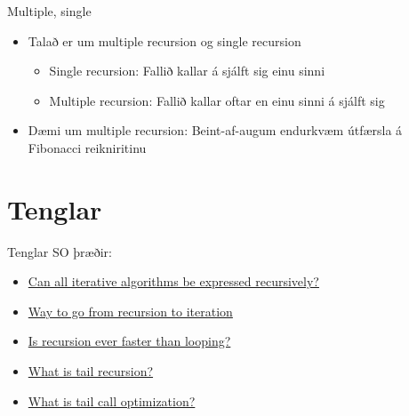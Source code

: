 \documentclass[handout]{beamer}
\begin{document}
\begin{frame}{Multiple, single}

\begin{itemize}
 \item Talað er um multiple recursion og single recursion
 \begin{itemize}
  \item Single recursion: Fallið kallar á sjálft sig einu sinni
  \item Multiple recursion: Fallið kallar oftar en einu sinni á sjálft sig
 \end{itemize}
 \item Dæmi um multiple recursion: Beint-af-augum endurkvæm útfærsla á Fibonacci reikniritinu
\end{itemize}
\end{frame}

\section{Tenglar}
\begin{frame}{Tenglar}
SO þræðir:
\begin{itemize}
 \item \href{http://stackoverflow.com/q/2093618/1675015}{Can all iterative algorithms be expressed recursively?}
 \item \href{http://stackoverflow.com/q/159590/1675015}{Way to go from recursion to iteration}
 \item \href{http://stackoverflow.com/q/2651112/1675015}{Is recursion ever faster than looping?}
 \item \href{http://stackoverflow.com/q/33923/1675015}{What is tail recursion?}
 \item \href{http://stackoverflow.com/q/310974/1675015}{What is tail call optimization?}
\end{itemize}

\end{frame}
\end{document}
